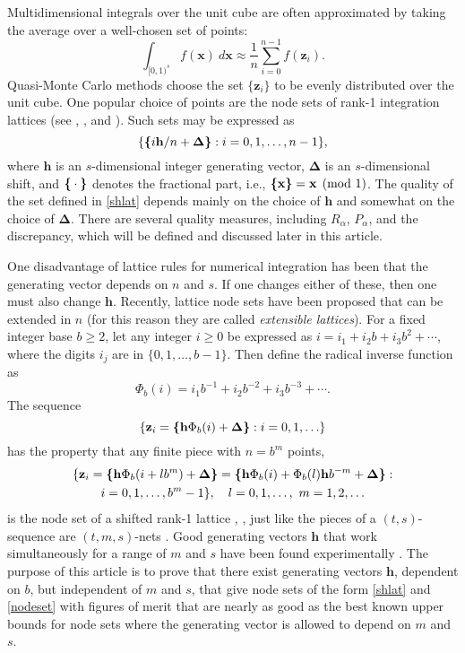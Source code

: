 \documentclass{article}
\renewcommand{\vec}[1]{\ensuremath{\mathbf{#1}}}
\newcommand{\vecsym}[1]{\ensuremath{\boldsymbol{#1}}}
\def\bbl{\text{\boldmath$\{$}}
\def\bbr{\text{\boldmath$\}$}}
\newcommand{\bbrace}[1]{\bbl #1 \bbr}
\newcommand{\bfDelta}{\vecsym \Delta}
\newcommand{\Cs}{[0,1)^{s}}
\newcommand{\h}{\vec h}
\newcommand{\x}{\vec x}
\newcommand{\z}{\vec z}
\begin{document}
Multidimensional integrals over the unit cube are often approximated 
by taking the average over a well-chosen set of points:
$$
\int_{\Cs} f(\x) \ d\x \approx \frac 1n \sum_{i=0}^{n-1} f(\z_{i}).
$$
Quasi-Monte Carlo methods \cite{Nie92} choose the set $\{\z_{i}\}$ to
be evenly distributed over the unit cube.  One popular choice of
points are the node sets of rank-1 integration lattices (see
\cite{HuaWan81}, \cite[Chapter 5]{Nie92}, and \cite{SloJoe94}).  Such
sets may be expressed as 
\begin{equation} \label{shlat}
    \{\bbrace{i \h/n + \bfDelta} : i=0,1, \ldots, n-1 \},
\end{equation}
where $\h$ is an $s$-dimensional integer generating vector, $\bfDelta$
is an $s$-dimensional shift, and $\bbrace{\cdot}$ denotes the
fractional part, i.e., $\bbrace{\x} = \x \pmod 1$.  The quality of the
set defined in \eqref{shlat} depends mainly on the choice of $\h$ and
somewhat on the choice of $\bfDelta$.  There are several quality
measures, including $R_{\alpha}$, $P_{\alpha}$, and the discrepancy, which will
be defined and discussed later in this article.

One disadvantage of lattice rules for numerical integration has been that the
generating vector depends on $n$ and $s$.  If one changes either of
these, then one must also change $\h$.  Recently, lattice node sets
have been proposed that can be extended in $n$ (for this reason they are
called {\it extensible lattices}).  For a fixed integer base $b
\ge 2$, let  any integer $i \ge 0$ be expressed as $i=i_{1}+i_{2}b +i_{3} 
b^{2} + \cdots$, where the digits $i_j$ are in $\{0,1,\ldots,b-1 \}$.  Then define the radical inverse function as
$$
\Phi_{b}(i) = i_{1}b^{-1} + i_{2}b^{-2} + i_{3}b^{-3} + \cdots .
$$
The sequence 
$$
\{ \z_{i}=\bbrace{\h \Phi_{b}(i) + \bfDelta} : i=0, 1, \ldots \}
$$
has the property that any finite piece with $n=b^{m}$ points,
\begin{multline} \label{nodeset}
\{\z_{i}=\bbrace{\h \Phi_{b}(i+lb^{m}) + \bfDelta} =\bbrace{\h 
\Phi_{b}(i) + \Phi_b(l)\h b^{-m} + \bfDelta}: \\
 i=0,1, \ldots,
b^{m}-1 \}, \quad l=0, 1, \ldots, \ m=1,2, \ldots
\end{multline}
is the node set of a shifted rank-1 lattice \cite{HicHon97a}, 
\cite{HicEtal00}, just
like the pieces of a $(t,s)$-sequence are $(t,m,s)$-nets \cite[Chapter
4]{Nie92}.  Good generating vectors $\h$ that work
simultaneously for a range of $m$
and $s$ have been found experimentally \cite{HicEtal00}.  The purpose
of this article is to prove that there exist generating vectors $\h$,
dependent on $b$, but independent of $m$ and $s$, that give node sets
of the form \eqref{shlat} and \eqref{nodeset} with figures of merit that are nearly as
good as the best known upper bounds for node sets where the generating
vector is allowed to depend on $m$ and $s$.
\end{document}
